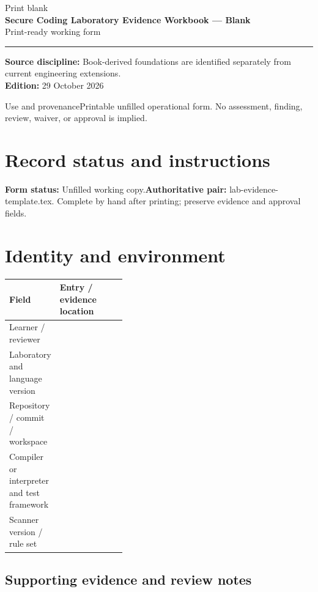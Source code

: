 \documentclass[10pt,letterpaper]{article}
\newcommand{\writearea}[1]{\par\begin{tcolorbox}[colback=white,colframe=linegray,boxrule=0.5pt,height=#1,sharp corners]\mbox{}\end{tcolorbox}\par}
\begin{document}
\hypersetup{pageanchor=false}%
\begin{titlepage}
\raggedright
\setlength{\parindent}{0pt}
\vspace*{1.0in}
{\color{bluegray}\Large Print blank}\\[1.0em]
{\color{navy}\Huge\bfseries Secure Coding Laboratory Evidence Workbook --- Blank}\\[0.7em]
{\Large Print-ready working form}\\[2.0em]
\rule{\linewidth}{1.0pt}
\vfill
\textbf{Source discipline:} Book-derived foundations are identified separately from current engineering extensions.\\
\textbf{Edition:} 29 October 2026
\end{titlepage}\hypersetup{pageanchor=true}
\tableofcontents
\clearpage
\begin{focusbox}{Use and provenance}Printable unfilled operational form. No assessment, finding, review, waiver, or approval is implied.\end{focusbox}
\section{Record status and instructions}
\textbf{Form status:} Unfilled working copy.\quad\textbf{Authoritative pair:} lab-evidence-template.tex. Complete by hand after printing; preserve evidence and approval fields.

\section{Identity and environment}
\begin{tabularx}{\linewidth}{@{}p{0.38\linewidth}Y@{}}
\toprule Field & Entry / evidence location\\\midrule
Learner / reviewer & \\[1.0em]
\midrule
Laboratory and language version & \\[1.0em]
\midrule
Repository / commit / workspace & \\[1.0em]
\midrule
Compiler or interpreter and test framework & \\[1.0em]
\midrule
Scanner version / rule set & \\[1.0em]
\midrule
\end{tabularx}
\subsection{Supporting evidence and review notes}
\writearea{1.45in}
\clearpage
\end{document}

